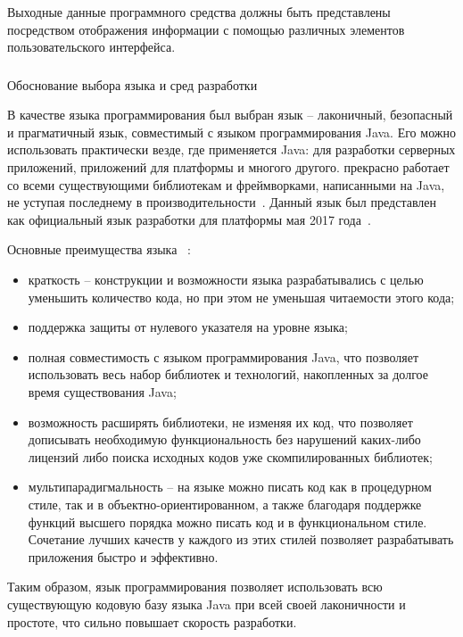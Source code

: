 Выходные данные программного средства должны быть представлены посредством отображения информации с помощью различных элементов пользовательского интерфейса.

\subsubsection{} Обоснование выбора языка и сред разработки
\label{sec:analysis:specification:lang_rationale}

В качестве языка программирования был выбран язык \kt -- лаконичный, безопасный и прагматичный язык, совместимый с языком программирования Java.
Его можно использовать практически везде, где применяется Java: для разработки серверных приложений, приложений для платформы \andro и многого другого.
\kt прекрасно работает со всеми существующими библиотекам и фреймворками, написанными на Java, не уступая последнему в производительности~\cite{kotlin_in_action}.
Данный язык был представлен как официальный язык разработки для платформы  мая 2017 года~\cite{kotlin_and_android}.

Основные преимущества языка \kt~\cite{kotlin_doc}:
\begin{itemize}
  \item краткость -- конструкции и возможности языка разрабатывались с целью уменьшить 
  количество кода, но при этом не уменьшая читаемости этого кода;
  \item поддержка защиты от нулевого указателя на уровне языка;
  \item полная совместимость с языком программирования Java, что позволяет использовать
  весь набор библиотек и технологий, накопленных за долгое время существования Java;
  \item возможность расширять библиотеки, не изменяя их код, что позволяет дописывать необходимую 
  функциональность без нарушений каких-либо лицензий либо поиска исходных кодов уже 
  скомпилированных библиотек;
  \item мультипарадигмальность -- на языке \kt можно писать код как в процедурном стиле, так и в
  объектно-ориентированном, а также благодаря поддержке функций высшего порядка можно 
  писать код и в функциональном стиле.
  Сочетание лучших качеств у каждого из этих стилей позволяет разрабатывать приложения быстро и эффективно.
\end{itemize}

Таким образом, язык программирования \kt позволяет использовать всю существующую кодовую базу языка Java при всей своей лаконичности и простоте, что сильно повышает скорость разработки.

